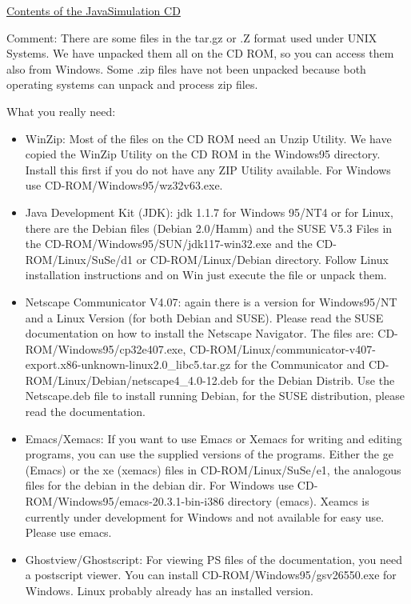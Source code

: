 \documentclass[a4paper,12pt]{article}
\begin{document}
\begin{center}
\underline{\LARGE Contents of the JavaSimulation CD}
\end{center}

Comment: There are some files in the tar.gz or .Z format used under
UNIX Systems. We have unpacked them all on the CD ROM, so you can 
access them also from Windows. Some .zip files have not been unpacked
because both operating systems can unpack and process zip files.

What you really need:
\begin{itemize}
\item WinZip: Most of the files on the CD ROM need an Unzip Utility.
  We have copied the WinZip Utility on the CD ROM in the Windows95 directory.
  Install this first if you do not have any ZIP Utility available.
  For Windows use CD-ROM/Windows95/wz32v63.exe.
\item Java Development Kit (JDK): jdk 1.1.7 for Windows 95/NT4 or for Linux,
  there are the Debian files (Debian 2.0/Hamm) and the SUSE V5.3 Files
  in the CD-ROM/Windows95/SUN/jdk117-win32.exe and the
  CD-ROM/Linux/SuSe/d1 or CD-ROM/Linux/Debian directory. Follow Linux
  installation instructions and on Win just execute the file or unpack them.
\item Netscape Communicator V4.07: again there is a version for Windows95/NT 
  and a Linux Version (for both Debian and SUSE). Please read the SUSE
  documentation on how to install the Netscape Navigator. The files are:
  CD-ROM/Windows95/cp32e407.exe, 
  CD-ROM/Linux/communicator-v407-export.x86-unknown-linux2.0\_libc5.tar.gz
  for the Communicator and CD-ROM/Linux/Debian/netscape4\_4.0-12.deb
  for the Debian Distrib. Use the Netscape.deb file to install running Debian,
  for the SUSE distribution, please read the documentation.
\item Emacs/Xemacs: If you want to use Emacs or Xemacs for writing and
  editing programs, you can use the supplied versions of the programs.
  Either the ge (Emacs) or the xe (xemacs) files in CD-ROM/Linux/SuSe/e1,
  the analogous files for the debian in the debian dir. For Windows use
  CD-ROM/Windows95/emacs-20.3.1-bin-i386 directory (emacs).
  Xeamcs is currently under development for Windows and not available for
  easy use. Please use emacs.
\item Ghostview/Ghostscript: For viewing PS files of the documentation, you
  need a postscript viewer. You can install 
  CD-ROM/Windows95/gsv26550.exe for Windows. Linux probably already has
  an installed version.

\end{itemize}
\end{document}
